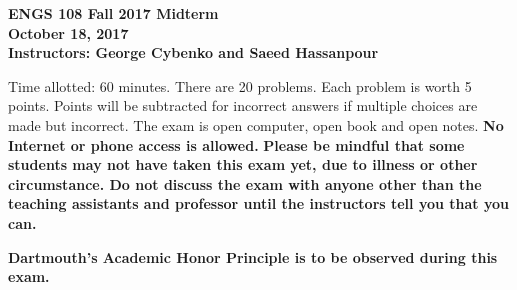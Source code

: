 \documentclass[11pt]{report}
\begin{document}
\begin{center}\bf  {\large ENGS 108 Fall 2017 Midterm}\\
October 18, 2017 \\
Instructors: George Cybenko and Saeed Hassanpour
\end{center}

\noindent Time allotted:  60 minutes.
There are 20 problems.  Each problem is worth 5 points.  Points will be subtracted for incorrect answers if multiple choices are made but incorrect.
The exam is open computer, open book and open notes.  {\bf No Internet 
or phone access is allowed.  }
{\bf Please be mindful that some students may not have taken this exam yet, due to illness or other circumstance.  Do not discuss the
exam with anyone other than the teaching assistants and professor until the instructors tell you that you can.} 


{\bf  Dartmouth's Academic Honor Principle is to be observed during this exam.}
\end{document}
